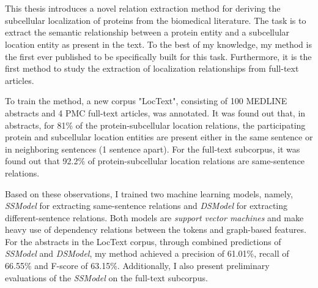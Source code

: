 \chapter{\abstractname}


This thesis introduces a novel relation extraction method for deriving the subcellular localization of proteins from the biomedical literature. The task is to extract the semantic relationship between a protein entity and a subcellular location entity as present in the text. To the best of my knowledge, my method is the first ever published to be specifically built for this task. Furthermore, it is the first method to study the extraction of localization relationships from full-text articles.

To train the method, a new corpus "LocText", consisting of 100 MEDLINE abstracts and 4 PMC full-text articles, was annotated. It was found out that, in abstracts, for 81\% of the protein-subcellular location relations, the participating protein and  subcellular location entities are present either in the same sentence or in neighboring sentences (1 sentence apart). For the full-text subcorpus, it was found out that 92.2\% of protein-subcellular location relations are same-sentence relations.

Based on these observations, I trained two machine learning models, namely, \textit{SSModel} for extracting same-sentence relations and \textit{DSModel} for extracting different-sentence relations. Both models are \textit{support vector machines} and make heavy use of dependency relations between the tokens and graph-based features. For the abstracts in the LocText corpus, through combined predictions of \textit{SSModel} and \textit{DSModel}, my method achieved a precision of 61.01\%, recall of 66.55\% and F-score of 63.15\%. Additionally, I also present preliminary evaluations of the \textit{SSModel} on the full-text subcorpus.